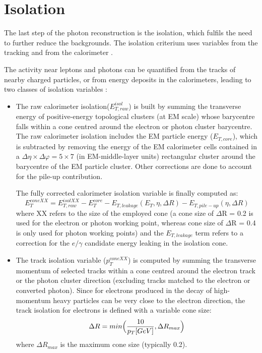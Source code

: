 \documentclass[a4paper, oneside, 11pt, openright]{book}
\begin{document}
		\section{Isolation}
			The last step of the photon reconstruction is the isolation, which fulfils the need to further reduce the backgrounds. The isolation criterium uses variables from the tracking and from the calorimeter \cite{isolation}.
			
			The activity near leptons and photons can be quantified from the tracks of nearby charged particles, or from energy deposits in the calorimeters, leading to two classes of isolation variables \cite{Aad_2019}:
			\begin{itemize}
				\item The raw calorimeter isolation($E_{T,raw}^{isol}$) is built by summing the transverse energy of positive-energy topological clusters (at EM scale) whose barycentre falls within a cone centred around the electron or photon cluster barycentre. The raw calorimeter isolation includes the EM particle energy ($E_{T,core}$), which is subtracted by removing the energy of the EM calorimeter cells contained in a $\Delta\eta \times \Delta\varphi = 5 \times 7$ (in EM-middle-layer units) rectangular
				cluster around the barycentre of the EM particle cluster. Other corrections are done to account for the pile-up contribution. %
				
				The fully corrected calorimeter isolation variable is finally computed as:
				$$ 
				E_{T}^{coneXX} = E_{T,raw}^{isolXX} - E_{T}^{core} - E_{T,leakage}(E_T,\eta,\Delta R) -E_{T,pile-up}(\eta,\Delta R)
				$$
				where XX refers to the size of the employed cone (a cone size of $\Delta$R = 0.2 is used for the electron or photon working point, whereas
				cone size of $\Delta$R = 0.4 is only used for photon working points) and the $E_{T,leakage}$ term refers to a correction for the $e/\gamma$ candidate energy leaking in the isolation cone.
				\item The track isolation variable ($p_T^{coneXX}$) is computed by summing the transverse momentum of selected tracks within a cone centred around the electron track or the photon cluster direction (excluding tracks matched to the electron or converted photon)\cite{El ph isol}. Since for electrons produced in the decay of high-momentum heavy particles can be very close to the electron direction, the track isolation for electrons is defined with a variable cone size:
				$$
				\Delta R = min\Bigl({\frac{10}{p_T[GeV]},\Delta R_{max}}\Bigr)
				$$
				where $\Delta R_{max}$ is the maximum cone size (typically 0.2).
				

\end{itemize}
\end{document}
